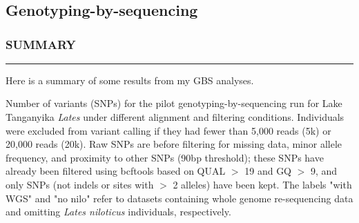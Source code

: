 \clearpage
\chapter{}
\section{Genotyping-by-sequencing}
\subsection*{SUMMARY}
\hrule
Here is a summary of some results from my GBS analyses.

\begin{table}[ht]
\centering
\caption{Number of variants (SNPs) for the pilot genotyping-by-sequencing run for Lake Tanganyika \textit{Lates} under different alignment and filtering conditions. Individuals were excluded from variant calling if they had fewer than 5,000 reads (5k) or 20,000 reads (20k). Raw SNPs are before filtering for missing data, minor allele frequency, and proximity to other SNPs (90bp threshold); these SNPs have already been filtered using bcftools based on QUAL $>$ 19 and GQ $>$ 9, and only SNPs (not indels or sites with $>$ 2 alleles) have been kept. The labels "with WGS" and "no nilo" refer to datasets containing whole genome re-sequencing data and omitting \textit{Lates niloticus} individuals, respectively.}


\end{table}
